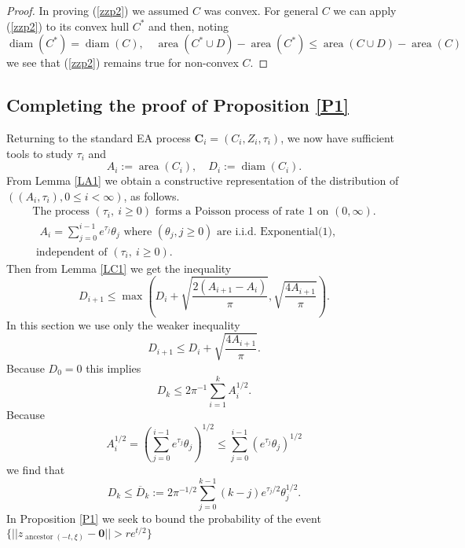 \documentclass[12pt]{article}
\newcommand{\sfrac}[2]{{\textstyle\frac{#1}{#2}}}
\newcommand{\bC}{{\mathbf C}}
\newcommand{\origin}{{\mathbf 0}}
\DeclareMathOperator{\diam}{diam}
\DeclareMathOperator{\area}{area}
\DeclareMathOperator{\ancestor}{ancestor}
\begin{document}
\begin{proof}
In proving (\ref{zzp2}) we assumed $C$ was convex.  For general $C$ we can apply 
(\ref{zzp2})  to its convex hull $C^*$ and then, noting
\[ \diam(C^*) = \diam(C), \quad 
\area(C^* \cup D) - \area(C^*) \le \area(C \cup D) - \area(C)\]
we see that (\ref{zzp2}) remains true for non-convex $C$.
\end{proof}

\subsection{Completing the proof of Proposition \ref{P1}}
\label{sec:completingP1}
Returning to the standard EA process
$\bC_i = (C_i, Z_i, \tau_i)$, we now have sufficient tools to study  $\tau_i$ and 
\[ A_i := \area(C_i), \quad D_i := \diam(C_i) . \]
From Lemma \ref{LA1} we obtain a constructive representation 
of the distribution of $((A_i,\tau_i), 0 \le i < \infty)$, as follows.  
\begin{eqnarray}
\mbox{
The process $(\tau_i, \ i \ge 0)$ forms a Poisson process of rate $1$ on 
$(0,\infty)$.} \label{tauA1}
\\ 
\mbox{ $A_i = \sum_{j=0}^{i-1} e^{\tau_j} \theta_j$ 
where $(\theta_j , j \ge 0)$ are i.i.d. Exponential($1$),}\nonumber  \\
\mbox{ independent of } (\tau_i, \ i \ge 0).
\label{area-exact}
\end{eqnarray}
Then from Lemma \ref{LC1} we get the inequality
\begin{equation}
D_{i+1} \le \max \left(
D_i + \sqrt{ \sfrac{2(A_{i+1} - A_i)}{\pi} } ,
\sqrt{ \sfrac{ 4 A_{i+1}}{\pi} } \right) .
\label{DDAA}
\end{equation}
In this section we use only the weaker inequality
\begin{equation}
 D_{i+1} \le D_i + \sqrt{ \sfrac{ 4 A_{i+1}}{\pi} } . 
\label{weaker}
\end{equation}
Because $D_0 = 0$ this implies 
\begin{equation}
 D_k \le 2\pi^{-1} \sum_{i=1}^k A_i^{1/2} . 
 \label{Dk2}
 \end{equation}
Because
\[ A_i^{1/2} = \left(\sum_{j=0}^{i-1} e^{\tau_j} \theta_j\right)^{1/2} 
\le \sum_{j=0}^{i-1}  (e^{\tau_j} \theta_j)^{1/2} \]
we find that
\begin{equation}
D_k \leq \overline{D}_k:= 2\pi^{-1/2} \sum_{j=0}^{k-1} 
(k-j)  e^{\tau_{j}/2} \theta_{j}^{1/2} .
\label{Dkk}
\end{equation}
In Proposition \ref{P1} we seek to bound the probability of the event
$ \{ ||z_{\ancestor(-t,\xi)} - \origin ||  > r e^{t/2} \}$
\end{document}
